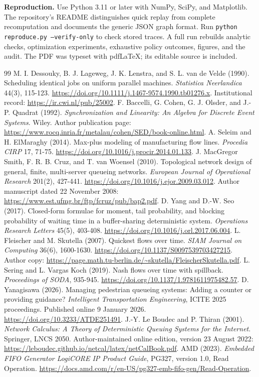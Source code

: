 \documentclass[11pt]{article}
\begin{document}
\textbf{Reproduction.} Use Python 3.11 or later with NumPy, SciPy, and Matplotlib. The repository's README distinguishes quick replay from complete recomputation and documents the generic JSON graph format. Run \texttt{python reproduce.py --verify-only} to check stored traces. A full run rebuilds analytic checks, optimization experiments, exhaustive policy outcomes, figures, and the audit. The PDF was typeset with pdfLaTeX; its editable source is included.

\begin{thebibliography}{99}\small
{} M. I. Dessouky, B. J. Lageweg, J. K. Lenstra, and S. L. van de Velde (1990). Scheduling identical jobs on uniform parallel machines. \emph{Statistica Neerlandica} 44(3), 115-123. \url{https://doi.org/10.1111/j.1467-9574.1990.tb01276.x}. Institutional record: \url{https://ir.cwi.nl/pub/25002}.
 F. Baccelli, G. Cohen, G. J. Olsder, and J.-P. Quadrat (1992). \emph{Synchronization and Linearity: An Algebra for Discrete Event Systems}. Wiley. Author publication page: \url{https://www.rocq.inria.fr/metalau/cohen/SED/book-online.html}.
 A. Seleim and H. ElMaraghy (2014). Max-plus modeling of manufacturing flow lines. \emph{Procedia CIRP} 17, 71-75. \url{https://doi.org/10.1016/j.procir.2014.01.133}.
 J. MacGregor Smith, F. R. B. Cruz, and T. van Woensel (2010). Topological network design of general, finite, multi-server queueing networks. \emph{European Journal of Operational Research} 201(2), 427-441. \url{https://doi.org/10.1016/j.ejor.2009.03.012}. Author manuscript dated 22 November 2008: \url{https://www.est.ufmg.br/ftp/fcruz/pub/bap2.pdf}.
 D. Yang and D.-W. Seo (2017). Closed-form formulae for moment, tail probability, and blocking probability of waiting time in a buffer-sharing deterministic system. \emph{Operations Research Letters} 45(5), 403-408. \url{https://doi.org/10.1016/j.orl.2017.06.004}.
 L. Fleischer and M. Skutella (2007). Quickest flows over time. \emph{SIAM Journal on Computing} 36(6), 1600-1630. \url{https://doi.org/10.1137/S0097539703427215}. Author copy: \url{https://page.math.tu-berlin.de/~skutella/FleischerSkutella.pdf}.
 L. Sering and L. Vargas Koch (2019). Nash flows over time with spillback. \emph{Proceedings of SODA}, 935-945. \url{https://doi.org/10.1137/1.9781611975482.57}.
 D. Yanagisawa (2026). Managing pedestrian queueing systems: Adding a counter or providing guidance? \emph{Intelligent Transportation Engineering}, ICITE 2025 proceedings. Published online 9 January 2026. \url{https://doi.org/10.3233/ATDE251491}.
 J.-Y. Le Boudec and P. Thiran (2001). \emph{Network Calculus: A Theory of Deterministic Queuing Systems for the Internet}. Springer, LNCS 2050. Author-maintained online edition, version 23 August 2022: \url{https://leboudec.github.io/netcal/latex/netCalBook.pdf}.
 AMD (2023). \emph{Embedded FIFO Generator LogiCORE IP Product Guide}, PG327, version 1.0, Read Operation. \url{https://docs.amd.com/r/en-US/pg327-emb-fifo-gen/Read-Operation}.
\end{thebibliography}
\end{document}
